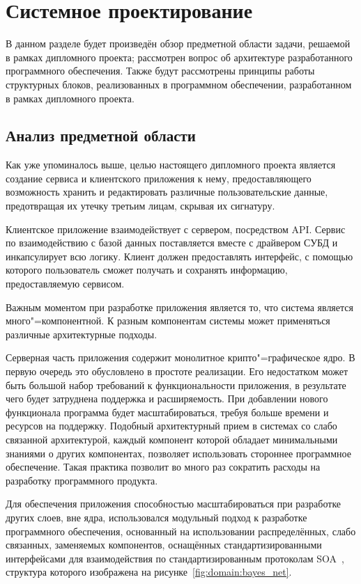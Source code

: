 \section{Системное проектирование}
\label{sec:domain}

В данном разделе будет произведён обзор предметной области задачи, решаемой в рамках дипломного проекта; рассмотрен вопрос об архитектуре разработанного программного обеспечения.
Также будут рассмотрены принципы работы структурных блоков, реализованных в программном обеспечении, разработанном в рамках дипломного проекта.

\subsection{Анализ предметной области}
\label{sub:domain:bayes_net}

Как уже упоминалось выше, целью настоящего дипломного проекта является создание сервиса и клиентского приложения к нему, предоставляющего возможность хранить и редактировать различные пользовательские данные, предотвращая их утечку третьим лицам, скрывая их сигнатуру.

Клиентское приложение взаимодействует с сервером, посредством API. Сервис по взаимодействию с базой данных поставляется вместе с драйвером СУБД и инкапсулирует всю логику. Клиент должен предоставлять интерфейс, с помощью которого пользователь сможет получать и сохранять информацию, предоставляемую сервисом.

Важным моментом при разработке приложения является то, что система является много"=компонентной. К разным компонентам системы может применяться различные архитектурные подходы.

Серверная часть приложения содержит монолитное крипто"=графическое ядро. В первую очередь это обусловлено в простоте реализации. Его недостатком может быть большой набор требований к функциональности приложения, в результате чего будет затруднена поддержка и расширяемость. При добавлении нового функционала программа будет масштабироваться, требуя больше времени и ресурсов на поддержку.
Подобный архитектурный прием в системах со слабо связанной архитектурой, каждый компонент которой обладает минимальными знаниями о других компонентах, позволяет использовать стороннее программное обеспечение. Такая практика позволит во много раз сократить расходы на разработку программного продукта.

Для обеспечения приложения способностью масштабироваться при разработке других слоев, вне ядра, использовался модульный подход к разработке программного обеспечения, основанный на использовании распределённых, слабо связанных, заменяемых компонентов, оснащённых стандартизированными интерфейсами для взаимодействия по стандартизированным протоколам SOA~\cite[с.~16\,--\,17]{sicp_2006_ru}, структура которого изображена на рисунке~\ref{fig:domain:bayes_net}.

